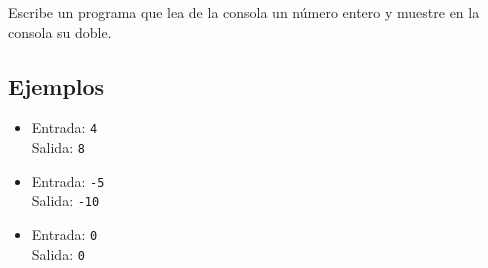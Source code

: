Escribe un programa que lea de la consola un número entero y muestre en la consola su doble.
\subsection*{Ejemplos}
\begin{itemize}
    \item Entrada: \texttt{4}\\
          Salida: \texttt{8}
    \item Entrada: \texttt{-5}\\
          Salida: \texttt{-10}
    \item Entrada: \texttt{0}\\
          Salida: \texttt{0}
\end{itemize}